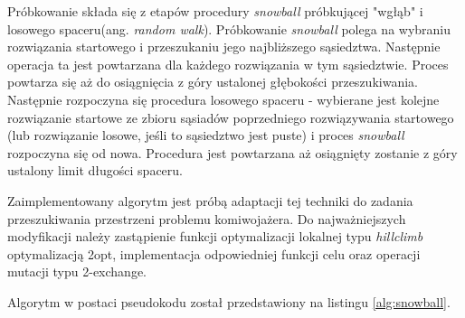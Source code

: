 Próbkowanie składa się z etapów procedury \textit{snowball} próbkującej "wgłąb" i losowego spaceru(ang. \textit{random walk}).
Próbkowanie \textit{snowball} polega na wybraniu rozwiązania startowego i przeszukaniu jego najbliższego sąsiedztwa.
Następnie operacja ta jest powtarzana dla każdego rozwiązania w tym sąsiedztwie. Proces powtarza się aż do osiągnięcia z góry ustalonej głębokości
przeszukiwania. Następnie rozpoczyna się procedura losowego spaceru - wybierane jest kolejne rozwiązanie startowe
ze zbioru sąsiadów poprzedniego rozwiązywania startowego (lub rozwiązanie losowe, jeśli to sąsiedztwo jest puste) i proces \textit{snowball}
rozpoczyna się od nowa. Procedura jest powtarzana aż osiągnięty zostanie z góry ustalony limit długości spaceru.

Zaimplementowany algorytm jest próbą adaptacji tej techniki do zadania przeszukiwania przestrzeni
problemu komiwojażera. Do najważniejszych modyfikacji należy zastąpienie funkcji optymalizacji lokalnej typu \textit{hillclimb}
optymalizacją 2opt, implementacja odpowiedniej funkcji celu oraz operacji mutacji typu 2-exchange.

Algorytm w postaci pseudokodu został przedstawiony na listingu \ref{alg:snowball}.

\vspace{1em}

